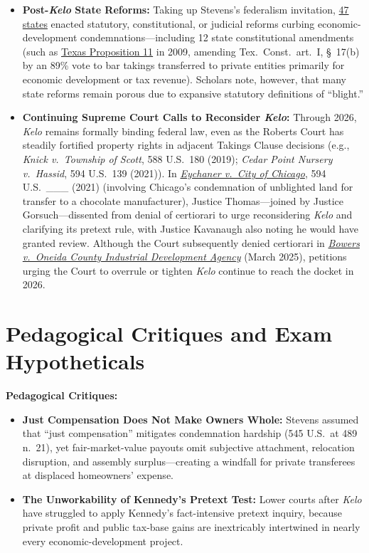 \documentclass[12pt]{article}
\begin{document}
\begin{itemize}
  \item \textbf{Post-\textit{Kelo} State Reforms:} Taking up Stevens's federalism invitation, \href{https://ij.org/issues/private-property/eminent-domain/}{47 states} enacted statutory, constitutional, or judicial reforms curbing economic-development condemnations---including 12 state constitutional amendments (such as \href{https://www.rstreet.org/commentary/texas-and-eminent-domain-law-better-than-elsewhere-but-still-room-for-improvement/}{Texas Proposition 11} in 2009, amending Tex.\ Const.\ art.\ I, \S~17(b) by an 89\% vote to bar takings transferred to private entities primarily for economic development or tax revenue). Scholars note, however, that many state reforms remain porous due to expansive statutory definitions of ``blight.''
  \item \textbf{Continuing Supreme Court Calls to Reconsider \textit{Kelo}:} Through 2026, \textit{Kelo} remains formally binding federal law, even as the Roberts Court has steadily fortified property rights in adjacent Takings Clause decisions (e.g., \textit{Knick v.\ Township of Scott}, 588 U.S.\ 180 (2019); \textit{Cedar Point Nursery v.\ Hassid}, 594 U.S.\ 139 (2021)). In \href{https://www.supremecourt.gov/opinions/20pdf/20-1214_7lh8.pdf}{\textit{Eychaner v.\ City of Chicago}}, 594 U.S.\ \_\_\_ (2021) (involving Chicago's condemnation of unblighted land for transfer to a chocolate manufacturer), Justice Thomas---joined by Justice Gorsuch---dissented from denial of certiorari to urge reconsidering \textit{Kelo} and clarifying its pretext rule, with Justice Kavanaugh also noting he would have granted review. Although the Court subsequently denied certiorari in \href{https://ij.org/case/bowers-v-oneida-county-industrial-development-agency/}{\textit{Bowers v.\ Oneida County Industrial Development Agency}} (March 2025), petitions urging the Court to overrule or tighten \textit{Kelo} continue to reach the docket in 2026.
\end{itemize}

\section{Pedagogical Critiques and Exam Hypotheticals}
\textbf{Pedagogical Critiques:}
\begin{itemize}
  \item \textbf{Just Compensation Does Not Make Owners Whole:} Stevens assumed that ``just compensation'' mitigates condemnation hardship (545 U.S.\ at 489 n.\ 21), yet fair-market-value payouts omit subjective attachment, relocation disruption, and assembly surplus---creating a windfall for private transferees at displaced homeowners' expense.
  \item \textbf{The Unworkability of Kennedy's Pretext Test:} Lower courts after \textit{Kelo} have struggled to apply Kennedy's fact-intensive pretext inquiry, because private profit and public tax-base gains are inextricably intertwined in nearly every economic-development project.
\end{itemize}
\end{document}
